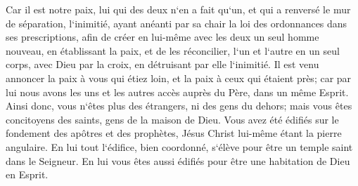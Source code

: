 \verse Car il est notre paix, lui qui des deux n`en a fait qu`un, et qui a renversé le mur de séparation, l`inimitié, 
\verse ayant anéanti par sa chair la loi des ordonnances dans ses prescriptions, afin de créer en lui-même avec les deux un seul homme nouveau, en établissant la paix, 
\verse et de les réconcilier, l`un et l`autre en un seul corps, avec Dieu par la croix, en détruisant par elle l`inimitié. 
\verse Il est venu annoncer la paix à vous qui étiez loin, et la paix à ceux qui étaient près; 
\verse car par lui nous avons les uns et les autres accès auprès du Père, dans un même Esprit. 
\verse Ainsi donc, vous n`êtes plus des étrangers, ni des gens du dehors; mais vous êtes concitoyens des saints, gens de la maison de Dieu. 
\verse Vous avez été édifiés sur le fondement des apôtres et des prophètes, Jésus Christ lui-même étant la pierre angulaire. 
\verse En lui tout l`édifice, bien coordonné, s`élève pour être un temple saint dans le Seigneur. 
\verse En lui vous êtes aussi édifiés pour être une habitation de Dieu en Esprit. 

